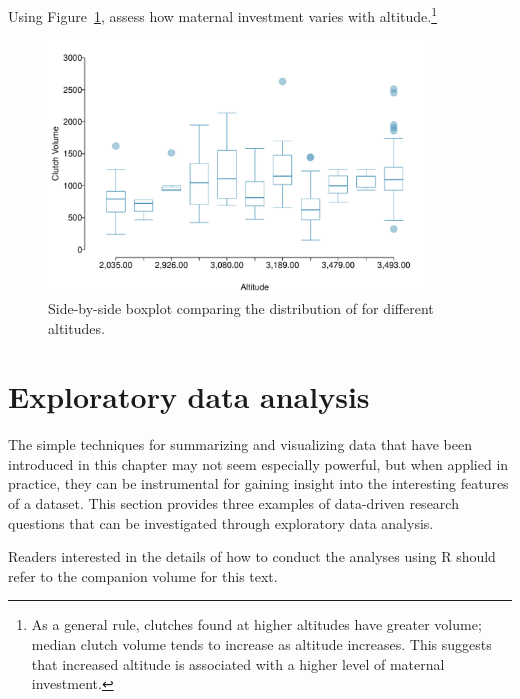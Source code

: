 

\begin{exercise} Using Figure~\ref{frogClutchVolAlt}, assess how maternal investment varies with altitude.\footnote{As a general rule, clutches found at higher altitudes have greater volume; median clutch volume tends to increase as altitude increases. This suggests that increased altitude is associated with a higher level of maternal investment.}
	
\begin{figure}[h!]
	\centering
	\includegraphics[width=0.9\textwidth]{ch_intro_to_data_oi_biostat/figures/frogClutchVolAlt/frogClutchVolAlt}
	\caption{Side-by-side boxplot comparing the distribution of  for different altitudes.}
	\label{frogClutchVolAlt}
\end{figure} 
	
\end{exercise}


\section[Exploratory data analysis]{Exploratory data analysis}

The simple techniques for summarizing and visualizing data that have been introduced in this chapter may not seem especially powerful, but when applied in practice, they can be instrumental for gaining insight into the interesting features of a dataset. This section provides three examples of data-driven research questions that can be investigated through exploratory data analysis.

Readers interested in the details of how to conduct the analyses using \textsf{R} should refer to the companion volume for this text. 

